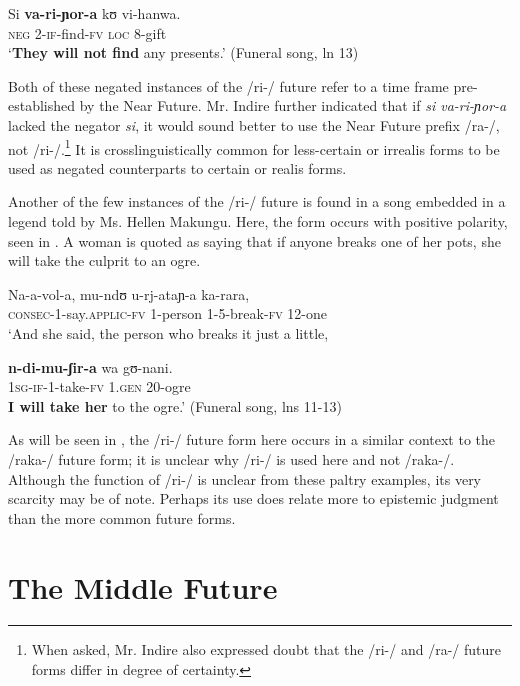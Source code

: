 \documentclass[output=paper]{langsci/langscibook}
\begin{document}
\ea\label{ex:sarvasy:10}
\gll Si   \textbf{va-ri-ɲor-a}   kʊ   vi-hanwa. \\
\textsc{neg}  2-\textsc{if-}find-\textsc{fv}  \textsc{loc}  8-gift \\
\glt ‘\textbf{They will not find} any presents.’ (Funeral song, ln 13)
\z

Both of these negated instances of the /ri-/ future refer to a time frame pre-established by the Near Future. Mr. Indire further indicated that if \textit{si va-ri-ɲor-a} lacked the negator \textit{si}, it would sound better to use the Near Future prefix /ra-/, not /ri-/.\footnote{When asked, Mr. Indire also expressed doubt that the /ri-/ and /ra-/ future forms differ in degree of certainty.} It is crosslinguistically common for less-certain or irrealis forms to be used as negated counterparts to certain or realis forms. 

Another of the few instances of the /ri-/ future is found in a song embedded in a legend told by Ms. Hellen Makungu. Here, the form occurs with positive polarity, seen in . A woman is quoted as saying that if anyone breaks one of her pots, she will take the culprit to an ogre.

\ea\label{ex:sarvasy:11}
\gll Na-a-vol-a,      mu-ndʊ  u-rj-ataɲ-a  ka-rara, \\
\textsc{consec-1}-say.\textsc{applic-fv}  1-person  1-5-break-\textsc{fv}  12-one \\
\glt ‘And she said, the person who breaks it just a little,

\gll \textbf{n-di-mu-ʃir-a}     wa   gʊ-nani. \\
\textsc{1sg-if-}1-take-\textsc{fv}  \textsc{1.gen}  20-ogre \\
\glt \textbf{I will take her} to the ogre.’ (Funeral song, lns 11-13)
\z

As will be seen in , the /ri-/ future form here occurs in a similar context to the \mbox{/raka-/} future form; it is unclear why /ri-/ is used here and not /raka-/. Although the function of /ri-/ is unclear from these paltry examples, its very scarcity may be of note. Perhaps its use does relate more to epistemic judgment than the more common future forms.

\section{The Middle Future}
\end{document}
